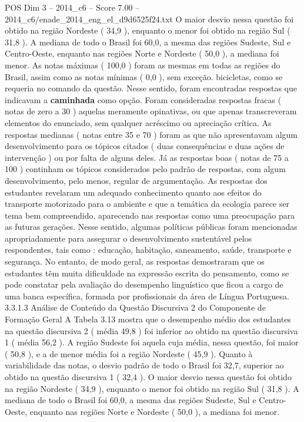 \begin{textsample}{POS Dim 3 – 2014\_c6 – Score 7.00 – 2014\_c6/enade\_2014\_eng\_el\_d9d6525f24.txt}
O maior desvio nessa questão foi obtido na região Nordeste ( 34,9 ), enquanto o menor foi obtido na região Sul ( 31,8 ).
A mediana de todo o Brasil foi 60,0, a mesma das regiões Sudeste, Sul e Centro-Oeste, enquanto nas regiões Norte e Nordeste ( 50,0 ), a mediana foi menor.
As notas máximas ( 100,0 ) foram as mesmas em todas as regiões do Brasil, assim como as notas mínimas ( 0,0 ), sem exceção. bicicletas, como se requeria no comando da questão.
Nesse sentido, foram encontradas respostas que indicavam a \textbf{caminhada} como opção.
Foram consideradas respostas fracas ( notas de zero a 30 ) aquelas meramente opinativas, ou que apenas transcreveram elementos do enunciado, sem qualquer acréscimo ou apreciação crítica.
As respostas medianas ( notas entre 35 e 70 ) foram as que não apresentavam algum desenvolvimento para os tópicos citados ( duas consequências e duas ações de intervenção ) ou por falta de alguns deles.
Já as respostas boas ( notas de 75 a 100 ) continham os tópicos considerados pelo padrão de respostas, com algum desenvolvimento, pelo menos, regular de argumentação.
As respostas dos estudantes revelaram um adequado conhecimento quanto aos efeitos do transporte motorizado para o ambiente e que a temática da ecologia parece ser tema bem compreendido, aparecendo nas respostas como uma preocupação para as futuras gerações.
Nesse sentido, algumas políticas públicas foram mencionadas apropriadamente para assegurar o desenvolvimento sustentável pelos respondentes, tais como : educação, habitação, saneamento, saúde, transporte e segurança.
No entanto, de modo geral, as respostas demostraram que os estudantes têm muita dificuldade na expressão escrita do pensamento, como se pode constatar pela avaliação do desempenho linguístico que ficou a cargo de uma banca específica, formada por profissionais da área de Língua Portuguesa. 3.3.1.3 Análise de Conteúdo da Questão Discursiva 2 do Componente de Formação Geral A Tabela 3.13 mostra que o desempenho médio dos estudantes na questão discursiva 2 ( média 49,8 ) foi inferior ao obtido na questão discursiva 1 ( média 56,2 ).
A região Sudeste foi aquela cuja média, nessa questão, foi maior ( 50,8 ), e a de menor média foi a região Nordeste ( 45,9 ).
Quanto à variabilidade das notas, o desvio padrão de todo o Brasil foi 32,7, superior ao obtido na questão discursiva 1 ( 32,4 ).
O maior desvio nessa questão foi obtido na região Nordeste ( 34,9 ), enquanto o menor foi obtido na região Sul ( 31,8 ).
A mediana de todo o Brasil foi 60,0, a mesma das regiões Sudeste, Sul e Centro-Oeste, enquanto nas regiões Norte e Nordeste ( 50,0 ), a mediana foi menor.

\end{textsample}
